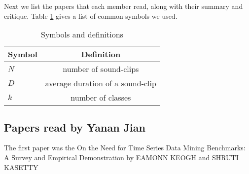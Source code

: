 Next we list the papers that each member read,
along with their summary and critique.
Table \ref{tab:symbols} gives a list of common symbols we used.

\begin{table}[htb]
\begin{center} 
\begin{tabular}{|l | c | } \hline \hline 
Symbol & Definition \\ \hline
$N$ & number of sound-clips \\
$D$ & average duration of a sound-clip \\
$k$  & number of classes \\ \hline
\end{tabular} 
\end{center} 
\caption{Symbols and definitions}
\label{tab:symbols} 
 \end{table} 


\subsection{Papers read by Yanan Jian}
The first paper was the On the Need for Time Series Data Mining Benchmarks: A Survey and Empirical Demonstration by EAMONN KEOGH and SHRUTI KASETTY

